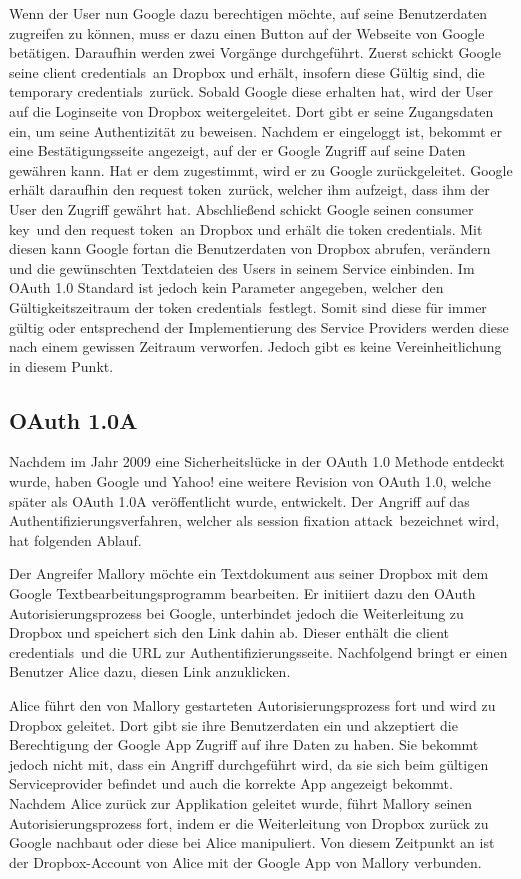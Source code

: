 Wenn der User nun Google dazu berechtigen möchte, auf seine Benutzerdaten zugreifen zu können, muss er dazu einen Button auf der Webseite von Google betätigen.
Daraufhin werden zwei Vorgänge durchgeführt.
Zuerst schickt Google seine \frqq client credentials\flqq\ an Dropbox und erhält, insofern diese Gültig sind, die \frqq temporary credentials\flqq\ zurück.
Sobald Google diese erhalten hat, wird der User auf die Loginseite von Dropbox weitergeleitet.
Dort gibt er seine Zugangsdaten ein, um seine Authentizität zu beweisen.
Nachdem er eingeloggt ist, bekommt er eine Bestätigungsseite angezeigt, auf der er Google Zugriff auf seine Daten gewähren kann.
Hat er dem zugestimmt, wird er zu Google zurückgeleitet.
Google erhält daraufhin den \frqq request token\flqq\ zurück, welcher ihm aufzeigt, dass ihm der User den Zugriff gewährt hat.
Abschließend schickt Google seinen \frqq consumer key\flqq\ und den \frqq request token\flqq\ an Dropbox und erhält die \frqq token credentials\flqq .
Mit diesen kann Google fortan die Benutzerdaten von Dropbox abrufen, verändern und die gewünschten Textdateien des Users in seinem Service einbinden.
Im OAuth 1.0 Standard ist jedoch kein Parameter angegeben, welcher den Gültigkeitszeitraum der \frqq token credentials\flqq\ festlegt.
Somit sind diese für immer gültig oder entsprechend der Implementierung des Service Providers werden diese nach einem gewissen Zeitraum verworfen.
Jedoch gibt es keine Vereinheitlichung in diesem Punkt.

\subsection{OAuth 1.0A}
Nachdem im Jahr 2009 eine Sicherheitslücke in der OAuth 1.0 Methode entdeckt wurde, haben Google und Yahoo! eine weitere Revision von OAuth 1.0, welche später als OAuth 1.0A veröffentlicht wurde, entwickelt\cite[vgl.][]{oauth10a}.
Der Angriff auf das Authentifizierungsverfahren, welcher als \frqq session fixation attack\flqq\ bezeichnet wird, hat folgenden Ablauf.

Der Angreifer Mallory möchte ein Textdokument aus seiner Dropbox mit dem Google Textbearbeitungsprogramm bearbeiten.
Er initiiert dazu den OAuth Autorisierungsprozess bei Google, unterbindet jedoch die Weiterleitung zu Dropbox und speichert sich den Link dahin ab.
Dieser enthält die \frqq client credentials\flqq\ und die URL zur Authentifizierungsseite.
Nachfolgend bringt er einen Benutzer Alice dazu, diesen Link anzuklicken.

Alice führt den von Mallory gestarteten Autorisierungsprozess fort und wird zu Dropbox geleitet.
Dort gibt sie ihre Benutzerdaten ein und akzeptiert die Berechtigung der Google \ac{App} Zugriff auf ihre Daten zu haben.
Sie bekommt jedoch nicht mit, dass ein Angriff durchgeführt wird, da sie sich beim gültigen Serviceprovider befindet und auch die korrekte \ac{App} angezeigt bekommt.
Nachdem Alice zurück zur Applikation geleitet wurde, führt Mallory seinen Autorisierungsprozess fort, indem er die Weiterleitung von Dropbox zurück zu Google nachbaut oder diese bei Alice manipuliert.
Von diesem Zeitpunkt an ist der Dropbox-Account von Alice mit der Google \ac{App} von Mallory verbunden.

